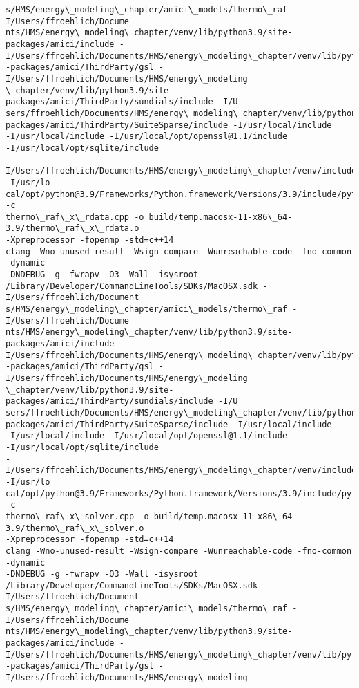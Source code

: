 \documentclass[11pt]{article}
\begin{document}
\begin{Verbatim}[commandchars=\\\{\}]
s/HMS/energy\_modeling\_chapter/amici\_models/thermo\_raf -I/Users/ffroehlich/Docume
nts/HMS/energy\_modeling\_chapter/venv/lib/python3.9/site-packages/amici/include -
I/Users/ffroehlich/Documents/HMS/energy\_modeling\_chapter/venv/lib/python3.9/site
-packages/amici/ThirdParty/gsl -I/Users/ffroehlich/Documents/HMS/energy\_modeling
\_chapter/venv/lib/python3.9/site-packages/amici/ThirdParty/sundials/include -I/U
sers/ffroehlich/Documents/HMS/energy\_modeling\_chapter/venv/lib/python3.9/site-
packages/amici/ThirdParty/SuiteSparse/include -I/usr/local/include
-I/usr/local/include -I/usr/local/opt/openssl@1.1/include
-I/usr/local/opt/sqlite/include
-I/Users/ffroehlich/Documents/HMS/energy\_modeling\_chapter/venv/include -I/usr/lo
cal/opt/python@3.9/Frameworks/Python.framework/Versions/3.9/include/python3.9 -c
thermo\_raf\_x\_rdata.cpp -o build/temp.macosx-11-x86\_64-3.9/thermo\_raf\_x\_rdata.o
-Xpreprocessor -fopenmp -std=c++14
clang -Wno-unused-result -Wsign-compare -Wunreachable-code -fno-common -dynamic
-DNDEBUG -g -fwrapv -O3 -Wall -isysroot
/Library/Developer/CommandLineTools/SDKs/MacOSX.sdk -I/Users/ffroehlich/Document
s/HMS/energy\_modeling\_chapter/amici\_models/thermo\_raf -I/Users/ffroehlich/Docume
nts/HMS/energy\_modeling\_chapter/venv/lib/python3.9/site-packages/amici/include -
I/Users/ffroehlich/Documents/HMS/energy\_modeling\_chapter/venv/lib/python3.9/site
-packages/amici/ThirdParty/gsl -I/Users/ffroehlich/Documents/HMS/energy\_modeling
\_chapter/venv/lib/python3.9/site-packages/amici/ThirdParty/sundials/include -I/U
sers/ffroehlich/Documents/HMS/energy\_modeling\_chapter/venv/lib/python3.9/site-
packages/amici/ThirdParty/SuiteSparse/include -I/usr/local/include
-I/usr/local/include -I/usr/local/opt/openssl@1.1/include
-I/usr/local/opt/sqlite/include
-I/Users/ffroehlich/Documents/HMS/energy\_modeling\_chapter/venv/include -I/usr/lo
cal/opt/python@3.9/Frameworks/Python.framework/Versions/3.9/include/python3.9 -c
thermo\_raf\_x\_solver.cpp -o build/temp.macosx-11-x86\_64-3.9/thermo\_raf\_x\_solver.o
-Xpreprocessor -fopenmp -std=c++14
clang -Wno-unused-result -Wsign-compare -Wunreachable-code -fno-common -dynamic
-DNDEBUG -g -fwrapv -O3 -Wall -isysroot
/Library/Developer/CommandLineTools/SDKs/MacOSX.sdk -I/Users/ffroehlich/Document
s/HMS/energy\_modeling\_chapter/amici\_models/thermo\_raf -I/Users/ffroehlich/Docume
nts/HMS/energy\_modeling\_chapter/venv/lib/python3.9/site-packages/amici/include -
I/Users/ffroehlich/Documents/HMS/energy\_modeling\_chapter/venv/lib/python3.9/site
-packages/amici/ThirdParty/gsl -I/Users/ffroehlich/Documents/HMS/energy\_modeling

\end{Verbatim}
\end{document}
